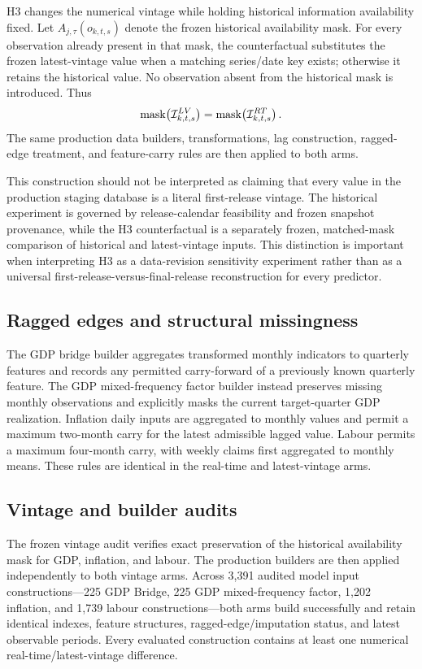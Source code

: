 H3 changes the numerical vintage while holding historical information
availability fixed. Let \(A_{j,\tau}(o_{k,t,s})\) denote the frozen historical
availability mask. For every observation already present in that mask, the
counterfactual substitutes the frozen latest-vintage value when a matching
series/date key exists; otherwise it retains the historical value. No
observation absent from the historical mask is introduced. Thus
\[
    \operatorname{mask}\!\left(\mathcal{I}^{LV}_{k,t,s}\right)
    =
    \operatorname{mask}\!\left(\mathcal{I}^{RT}_{k,t,s}\right).
\]
The same production data builders, transformations, lag construction,
ragged-edge treatment, and feature-carry rules are then applied to both arms.

This construction should not be interpreted as claiming that every value in
the production staging database is a literal first-release vintage. The
historical experiment is governed by release-calendar feasibility and frozen
snapshot provenance, while the H3 counterfactual is a separately frozen,
matched-mask comparison of historical and latest-vintage inputs. This
distinction is important when interpreting H3 as a data-revision sensitivity
experiment rather than as a universal first-release-versus-final-release
reconstruction for every predictor.

\subsection{Ragged edges and structural missingness}

The GDP bridge builder aggregates transformed monthly indicators to quarterly
features and records any permitted carry-forward of a previously known
quarterly feature. The GDP mixed-frequency factor builder instead preserves
missing monthly observations and explicitly masks the current target-quarter
GDP realization. Inflation daily inputs are aggregated to monthly values and
permit a maximum two-month carry for the latest admissible lagged value.
Labour permits a maximum four-month carry, with weekly claims first aggregated
to monthly means. These rules are identical in the real-time and latest-vintage
arms.

\subsection{Vintage and builder audits}

The frozen vintage audit verifies exact preservation of the historical
availability mask for GDP, inflation, and labour. The production builders are
then applied independently to both vintage arms. Across 3,391 audited model
input constructions---225 GDP Bridge, 225 GDP mixed-frequency factor, 1,202
inflation, and 1,739 labour constructions---both arms build successfully and
retain identical indexes, feature structures, ragged-edge/imputation status,
and latest observable periods. Every evaluated construction contains at least
one numerical real-time/latest-vintage difference.

